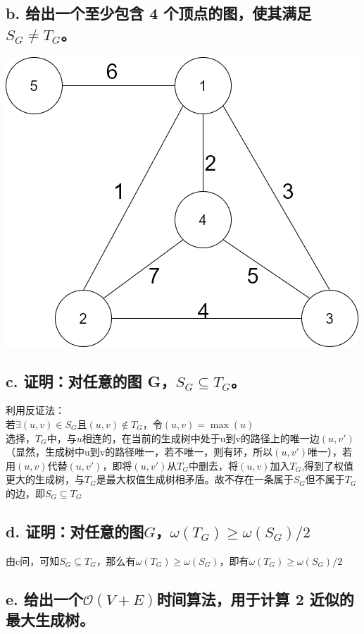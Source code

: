 \documentclass[UTF8]{ctexart}
\begin{document}
\subsection{b. 给出一个至少包含 4 个顶点的图，使其满足 $S_G\neq T_G$。}
\includegraphics[scale=0.3]{5.png}
\subsection{c. 证明：对任意的图 G，$S_G \subseteq T_G$。}
利用反证法：\\
若$\exists(u,v)\in S_G$且$(u,v)\notin T_G$，令$(u,v)=\max{(u)}$\\
选择，$T_G$中，与$u$相连的，在当前的生成树中处于u到v的路径上的唯一边$(u,v')$（显然，生成树中u到v的路径唯一，若不唯一，则有环，所以$(u,v')$唯一），若用$(u,v)$代替$(u,v')$，即将$(u,v')$从$T_G$中删去，将$(u,v)$加入$T_G$,得到了权值更大的生成树，与$T_G$是最大权值生成树相矛盾。故不存在一条属于$S_G$但不属于$T_G$的边，即$S_G\subseteq T_G$
\subsection{d. 证明：对任意的图$G$，$\omega(T_G)\geq \omega(S_G)/2$}
由c问，可知$S_G\subseteq T_G$，那么有$\omega(T_G)\geq \omega(S_G)$，即有$\omega(T_G)\geq \omega(S_G)/2$
\subsection{e. 给出一个$\mathcal{O}(V+E)$时间算法，用于计算 2 近似的最大生成树。}
\end{document}
